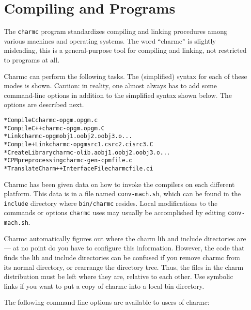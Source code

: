 \section{Compiling \converse{} and \charmpp{} Programs}

The {\tt charmc} program standardizes compiling and linking procedures
among various machines and operating systems.  The word ``charmc'' is
slightly misleading, this is a general-purpose tool for compiling and
linking, not restricted to \charmpp{} programs at all.

Charmc can perform the following tasks.  The (simplified) syntax for
each of these modes is shown.  Caution: in reality, one almost always
has to add some command-line options in addition to the simplified
syntax shown below.  The options are described next.

\begin{alltt}
 * Compile C                        charmc -o pgm.o pgm.c
 * Compile C++                      charmc -o pgm.o pgm.C
 * Link                             charmc -o pgm   obj1.o obj2.o obj3.o...
 * Compile + Link                   charmc -o pgm   src1.c src2.ci src3.C
 * Create Library                   charmc -o lib.a obj1.o obj2.o obj3.o...
 * CPM preprocessing                charmc -gen-cpm file.c
 * Translate Charm++ Interface File charmc file.ci
\end{alltt}

Charmc has been given data on how to invoke the compilers on each
different platform.  This data is in a file named {\tt conv-mach.sh},
which can be found in the {\tt include} directory where 
{\tt bin/charmc} resides.
Local modifications to the commands or options {\tt charmc} uses may
usually be accomplished by editing {\tt conv-mach.sh}.

Charmc automatically figures out where the charm lib and include
directories are --- at no point do you have to configure this
information.  However, the code that finds the lib and include
directories can be confused if you remove charmc from its normal
directory, or rearrange the directory tree.  Thus, the files in the
charm distribution must be left where they are, relative to each
other.  Use symbolic links if you want to put a copy of charmc into
a local bin directory.

The following command-line options are available to users of charmc:

